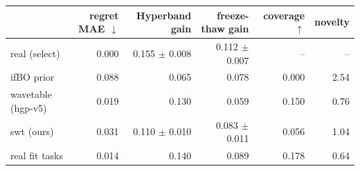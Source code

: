 \begin{tabular}{lrrrrr}
\toprule
 & regret MAE $\downarrow$ & Hyperband gain & freeze-thaw gain & coverage $\uparrow$ & novelty \\
\midrule
real (select) & 0.000 & 0.155 $\pm$ 0.008 & 0.112 $\pm$ 0.007 & -- & -- \\
ifBO prior & 0.088 & 0.065 & 0.078 & 0.000 & 2.54 \\
wavetable (hgp-v5) & 0.019 & 0.130 & 0.059 & 0.150 & 0.76 \\
swt (ours) & 0.031 & 0.110 $\pm$ 0.010 & 0.083 $\pm$ 0.011 & 0.056 & 1.04 \\
real fit tasks & 0.014 & 0.140 & 0.089 & 0.178 & 0.64 \\
\bottomrule
\end{tabular}
